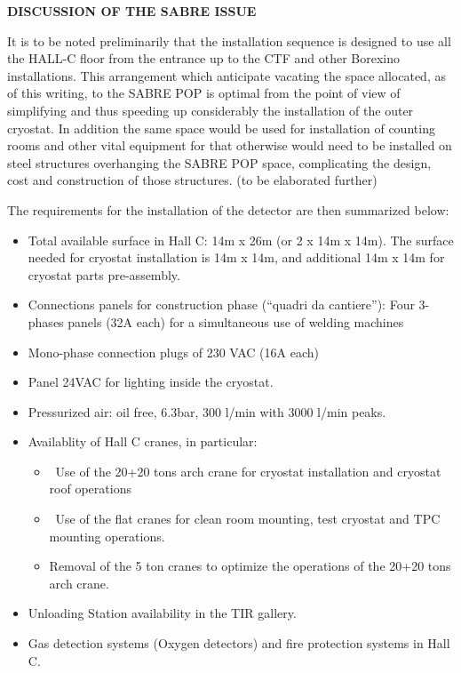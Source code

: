 \vspace{1cm}

{\bf DISCUSSION OF THE SABRE ISSUE}

It is to be noted preliminarily that the installation sequence is designed to use all the HALL-C floor from the entrance up to the CTF and other Borexino installations. This arrangement which anticipate vacating the space allocated, as of this writing, to the SABRE POP is optimal from the point of view of simplifying and thus speeding up considerably the installation of the outer cryostat. In addition the same space would be used for installation of counting rooms and other vital equipment for 
\DSk that otherwise would need to be installed on steel structures overhanging the SABRE POP space, complicating the design, cost and construction of those structures.
(to be elaborated further)

\vspace{1cm}

The requirements for the installation of the \DSk detector are then summarized below:

\begin{itemize}

\item Total available surface in Hall C: 14m x 26m (or 2 x 14m x 14m). The surface needed for cryostat installation is 14m x 14m, and additional 14m x 14m for cryostat parts pre-assembly. 
\item Connections panels for construction phase (“quadri da cantiere”): Four 3-phases panels (32A each) for a simultaneous use of welding machines
\item Mono-phase connection plugs of 230 VAC (16A each)
\item Panel 24VAC for lighting inside the cryostat.
\item Pressurized air: oil free, 6.3bar, 300 l/min with 3000 l/min peaks.
\item Availablity of Hall C cranes, in particular:
\begin{itemize}[label=-]
\item Use of the 20+20 tons arch crane for cryostat installation and cryostat roof operations
\item Use of the flat cranes for clean room mounting, test cryostat and TPC mounting operations.
\item Removal of the 5 ton cranes to optimize the operations of the 20+20 tons arch crane.
\end{itemize}
\item Unloading Station availability in the TIR gallery.
\item Gas detection systems (Oxygen detectors) and fire protection systems in Hall C.

\end{itemize}

